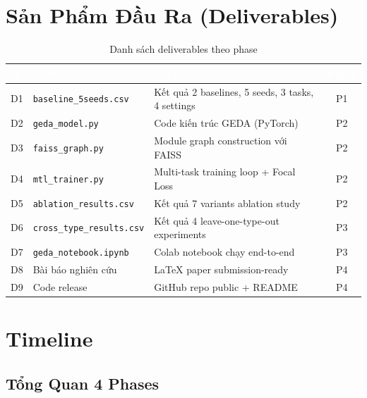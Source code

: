 \documentclass[12pt,a4paper]{article}
\begin{document}
\section{Sản Phẩm Đầu Ra (Deliverables)}

\begin{table}[H]
\centering
\caption{Danh sách deliverables theo phase}
\begin{tabularx}{\textwidth}{c l X c}
\toprule
\rowcolor{tableheader}
\textcolor{white}{\#} & \textcolor{white}{\textbf{Deliverable}} & \textcolor{white}{\textbf{Mô tả}} & \textcolor{white}{\textbf{Phase}} \\
\midrule
D1 & \texttt{baseline\_5seeds.csv} & Kết quả 2 baselines, 5 seeds, 3 tasks, 4 settings & P1 \\
D2 & \texttt{geda\_model.py} & Code kiến trúc GEDA (PyTorch) & P2 \\
D3 & \texttt{faiss\_graph.py} & Module graph construction với FAISS & P2 \\
D4 & \texttt{mtl\_trainer.py} & Multi-task training loop + Focal Loss & P2 \\
D5 & \texttt{ablation\_results.csv} & Kết quả 7 variants ablation study & P2 \\
D6 & \texttt{cross\_type\_results.csv} & Kết quả 4 leave-one-type-out experiments & P3 \\
D7 & \texttt{geda\_notebook.ipynb} & Colab notebook chạy end-to-end & P3 \\
D8 & Bài báo nghiên cứu & LaTeX paper submission-ready & P4 \\
D9 & Code release & GitHub repo public + README & P4 \\
\bottomrule
\end{tabularx}
\end{table}

\section{Timeline}

\subsection{Tổng Quan 4 Phases}
\end{document}
